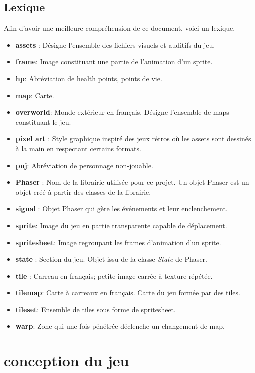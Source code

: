 \documentclass[11pt]{article}
\begin{document}
\subsection{Lexique}
Afin d'avoir une meilleure compréhension de ce document, voici un lexique. \\
\begin{itemize}{}{}
\item \textbf{assets} : Désigne l'ensemble des fichiers visuels et auditifs du jeu.
\item \textbf{frame}: Image constituant une partie de l'animation d'un sprite.
\item \textbf{hp}: Abréviation de health points, points de vie.
\item \textbf{map}: Carte.
\item \textbf{overworld}: Monde extérieur en français. Désigne l'ensemble de maps constituant le jeu.
\item \textbf{pixel art} : Style graphique inspiré des jeux rétros où les assets sont dessinés à la main en respectant certains formats.
\item \textbf{pnj}: Abréviation de personnage non-jouable.
\item \textbf{Phaser} : Nom de la librairie utilisée pour ce projet. Un objet Phaser est un objet créé à partir des classes de la librairie.
\item \textbf{signal} : Objet Phaser qui gère les événements et leur enclenchement.
\item \textbf{sprite}: Image du jeu en partie transparente capable de déplacement.
\item \textbf{spritesheet}: Image regroupant les frames d'animation d'un sprite.
\item \textbf{state} : Section du jeu. Objet issu de la classe \textit{State} de Phaser.
\item \textbf{tile} : Carreau en français; petite image carrée à texture répétée.
\item \textbf{tilemap}: Carte à carreaux en français. Carte du jeu formée par des tiles.
\item \textbf{tileset}: Ensemble de tiles sous forme de spritesheet.
\item \textbf{warp}: Zone qui une fois pénétrée déclenche un changement de map.
\end{itemize}

\section{conception du jeu}
\end{document}
